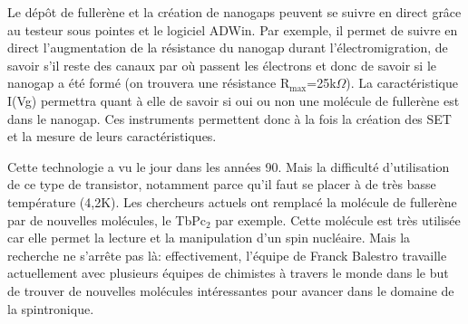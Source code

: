 \documentclass[a4paper,11pt]{report}
\begin{document}
Le dépôt de fullerène et la création de nanogaps peuvent se suivre en direct grâce au testeur sous pointes et le logiciel ADWin. Par exemple, il permet de suivre en direct l'augmentation de la résistance du nanogap durant l'électromigration, de savoir s'il reste des canaux par où passent les électrons et donc de savoir si le nanogap a été formé (on trouvera une résistance R$_\text{max}$=25k$\Omega$). La caractéristique I(Vg) permettra quant à elle de savoir si oui ou non une molécule de fullerène est dans le nanogap. Ces instruments permettent donc à la fois la création des SET et la mesure de leurs caractéristiques.

Cette technologie a vu le jour dans les années 90. Mais la difficulté d'utilisation de ce type de transistor, notamment parce qu'il faut se placer à de très basse température (4,2K). Les chercheurs actuels ont remplacé la molécule de fullerène par de nouvelles molécules, le TbPc$_2$ par exemple. Cette molécule est très utilisée car elle permet la lecture et la manipulation d'un spin nucléaire. Mais la recherche ne s’arrête pas là: effectivement, l'équipe de Franck Balestro travaille actuellement avec plusieurs équipes de chimistes à travers le monde dans le but de trouver de nouvelles molécules intéressantes pour avancer dans le domaine de la spintronique.


\end{document}
